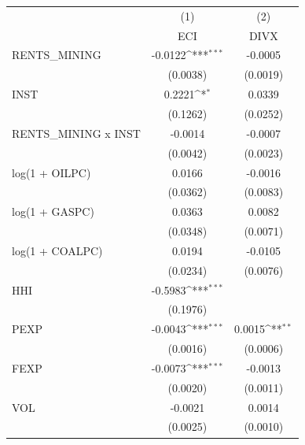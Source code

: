 {
\def\sym#1{\ifmmode^{#1}\else\(^{#1}\)\fi}
\begin{tabular}{l*{2}{c}}
\toprule
                    &\multicolumn{1}{c}{(1)}&\multicolumn{1}{c}{(2)}\\
                    &\multicolumn{1}{c}{ECI}&\multicolumn{1}{c}{DIVX}\\
\midrule
RENTS\_MINING        &     -0.0122\sym{***}&     -0.0005         \\
                    &    (0.0038)         &    (0.0019)         \\
\addlinespace
INST                &      0.2221\sym{*}  &      0.0339         \\
                    &    (0.1262)         &    (0.0252)         \\
\addlinespace
RENTS\_MINING x INST &     -0.0014         &     -0.0007         \\
                    &    (0.0042)         &    (0.0023)         \\
\addlinespace
log(1 + OILPC)      &      0.0166         &     -0.0016         \\
                    &    (0.0362)         &    (0.0083)         \\
\addlinespace
log(1 + GASPC)      &      0.0363         &      0.0082         \\
                    &    (0.0348)         &    (0.0071)         \\
\addlinespace
log(1 + COALPC)     &      0.0194         &     -0.0105         \\
                    &    (0.0234)         &    (0.0076)         \\
\addlinespace
HHI                 &     -0.5983\sym{***}&                     \\
                    &    (0.1976)         &                     \\
\addlinespace
PEXP                &     -0.0043\sym{***}&      0.0015\sym{**} \\
                    &    (0.0016)         &    (0.0006)         \\
\addlinespace
FEXP                &     -0.0073\sym{***}&     -0.0013         \\
                    &    (0.0020)         &    (0.0011)         \\
\addlinespace
VOL                 &     -0.0021         &      0.0014         \\
                    &    (0.0025)         &    (0.0010)         \\

\end{tabular}}
